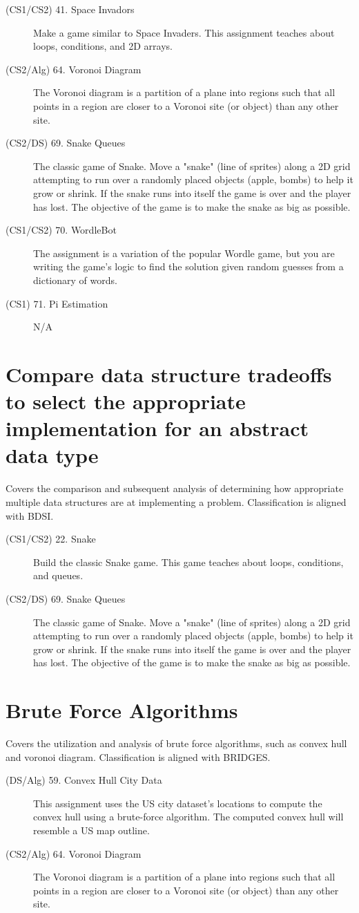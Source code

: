 \documentclass[10pt, onecoulmn]{article}
\begin{document}
\begin{description}
	\item[(CS1/CS2) 41. Space Invadors] Make a game similar to Space Invaders. This assignment teaches about loops, conditions, and 2D arrays.
	\item[(CS2/Alg) 64. Voronoi Diagram] The Voronoi diagram is a partition of a plane into regions such that all points in a region are closer to a Voronoi site (or object) than any other site.
	\item[(CS2/DS) 69. Snake Queues] The classic game of Snake. Move a "snake" (line of sprites) along a 2D grid attempting to run over a randomly placed objects (apple, bombs) to help it grow or shrink. If the snake runs into itself the game is over and the player has lost. The objective of the game is to make the snake as big as possible.
	\item[(CS1/CS2) 70. WordleBot] The assignment is a variation of the popular Wordle game, but you are writing the game's logic to find the solution given random guesses from a dictionary of words.
	\item[(CS1) 71. Pi Estimation] N/A
\end{description}
\section{Compare data structure tradeoffs to select the appropriate implementation for an abstract data type}
Covers the comparison and subsequent analysis of determining how appropriate multiple data structures are at implementing a problem. Classification is aligned with BDSI.
\begin{description}
	\item[(CS1/CS2) 22. Snake] Build the classic Snake game. This game teaches about loops, conditions, and queues.
	\item[(CS2/DS) 69. Snake Queues] The classic game of Snake. Move a "snake" (line of sprites) along a 2D grid attempting to run over a randomly placed objects (apple, bombs) to help it grow or shrink. If the snake runs into itself the game is over and the player has lost. The objective of the game is to make the snake as big as possible.
\end{description}
\section{Brute Force Algorithms}
Covers the utilization and analysis of brute force algorithms, such as convex hull and voronoi diagram. Classification is aligned with BRIDGES.
\begin{description}
	\item[(DS/Alg) 59. Convex Hull City Data] This assignment uses the US city dataset's locations to compute the convex hull using a brute-force algorithm. The computed convex hull will resemble a US map outline.
	\item[(CS2/Alg) 64. Voronoi Diagram] The Voronoi diagram is a partition of a plane into regions such that all points in a region are closer to a Voronoi site (or object) than any other site.
\end{description}
\end{document}
